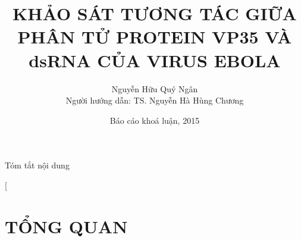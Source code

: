 \documentclass[10pt]{beamer}
\makeatletter
\newcommand\makebeamertitle{\frame{\maketitle}}%
\let\origtableofcontents=\tableofcontents
\def\tableofcontents{\@ifnextchar[{\origtableofcontents}{\gobbletableofcontents}}
\def\gobbletableofcontents#1{\origtableofcontents}
\makeatother
\begin{document}
\title[Khảo sát tương tác giữa phân tử protein VP35 và dsRNA của virus Ebola]{KHẢO SÁT TƯƠNG TÁC GIỮA PHÂN TỬ PROTEIN VP35 VÀ dsRNA CỦA VIRUS EBOLA}




\author[Nguyễn Hữu Quý Ngân]{Nguyễn Hữu Quý Ngân \\Người hướng dẫn: TS. Nguyễn Hà Hùng Chương}




\date[Tháng 7, 2015]{Báo cáo khoá luận, 2015}

\makebeamertitle








\begin{frame}{Tóm tắt nội dung}


\tableofcontents{}




\end{frame}

\section{TỔNG QUAN}
\end{document}
